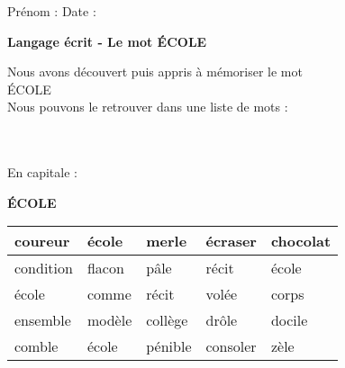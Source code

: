 \documentclass[a4paper, 11pt,oneside, fleqn]{article}
\begin{document}
\newcommand{\x}{\times}
\renewcommand{\arraystretch}{1.5}

\sloppy
\pagestyle{empty}
\begin{onehalfspace}


\sffamily \noindent \Large Pr\'enom : \fbox{\begin{minipage}{9cm} \vspace{1.2cm}\hspace{9cm} \end{minipage}} \hspace{1.5cm}\Large Date :\vspace{2mm}\\
\begin{minipage}{12cm}
\begin{center}
\Large\textbf{Langage \'ecrit - Le mot \MakeUppercase{école}}
\end{center}
\normalsize Nous avons d\'ecouvert puis appris \`a m\'emoriser le mot\\
\MakeUppercase{école}\\
Nous pouvons le retrouver dans une liste de mots : \end{minipage}\\
\vspace{0.25cm}\\
 
\large\noindent En capitale :
\begin{center}
{\huge \textbf{\MakeUppercase{école}}}
\vspace{0.25cm}\\
\begin{tabulary}{17cm}{|g|g|g|g|g|}
\hline
coureur & école & merle & écraser & chocolat \\
\hline
condition & flacon & pâle & récit & école \\
\hline
école & comme & récit & volée & corps \\
\hline
ensemble & modèle & collège & drôle & docile \\
\hline
comble & école & pénible & consoler & zèle \\
\hline
\end{tabulary}
\end{center}
\vspace{0.5cm}


\end{onehalfspace}
\end{document}
